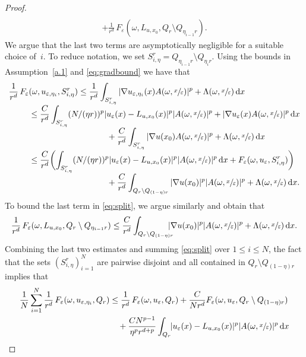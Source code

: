 \documentclass[10pt]{amsart}
\theoremstyle{definition}
\let\e\varepsilon
\let\w\omega
\newcommand{\dx}{\,\mathrm{d}x}
\begin{document}
\begin{proof}
\begin{multline}
\\
+\frac{1}{r^d}\,F_{\e}(\w,L_{u,x_0},Q_{r}\setminus Q_{\eta_{i-1}r}).
\end{multline}
We argue that the last two terms are asymptotically negligible for a suitable choice of~$i$. To reduce notation, we set $S_{i,\eta}^r=Q_{\eta_{i-1}r}\setminus Q_{\eta_i r}$. Using the bounds in Assumption~\ref{a.1} and \eqref{eq:gradbound} we have that
\begin{align*}
\frac{1}{r^d}\,F_{\e}&(\w,u_{\e,\eta_i},S^r_{i,\eta})\leq \frac{1}{r^d}\int_{S^r_{i,\eta}}|\nabla u_{\e,\eta_i}(x)A(\w,\sfrac{x}{\e})|^p+\Lambda(\w,\sfrac{x}{\e})\dx
\\[-3pt]
&\leq \frac{C}{r^d}\int_{S^r_{i,\eta}}(N/(\eta r))^{p} |u_{\e}(x)-L_{u,x_0}(x)|^p|A(\w,\sfrac{x}{\e})|^p+|\nabla u_{\e}(x)A(\w,\sfrac{x}{\e})|^p\dx
\\[-3pt]
&\hspace*{3.3cm}+\frac{C}{r^d}\int_{S^r_{i,\eta}}|\nabla u(x_0)A(\w,\sfrac{x}{\e})|^p+\Lambda(\w,\sfrac{x}{\e})\dx
\\[-3pt]
&\leq \frac{C}{r^d} \biggl(\int_{S_{i,\eta}^r}(N/(\eta r))^{p} |u_{\e}(x)-L_{u,x_0}(x)|^p|A(\w,\sfrac{x}{\e})|^p\dx+F_{\e}(\w,u_{\e},S_{i,\eta}^r)\biggr)
\\[-3pt]
&\hspace*{3.3cm}+\frac{C}{r^d}\int_{Q_r\setminus Q_{(1-\eta)r}}|\nabla u(x_0)|^p|A(\w,\sfrac{x}{\e})|^p+\Lambda(\w,\sfrac{x}{\e})\dx.
\end{align*}
To bound the last term in \eqref{eq:split}, we argue similarly and obtain that
\begin{equation*}
\frac{1}{r^d}\,F_{\e}(\w,L_{u,x_0},Q_{r}\setminus Q_{\eta_{i-1}r})\leq \frac{C}{r^d}\int_{Q_r\setminus Q_{(1-\eta) r}}\hspace*{-3mm}|\nabla u(x_0)|^p|A(\w,\sfrac{x}{\e})|^p+\Lambda(\w,\sfrac{x}{\e})\dx.
\end{equation*}
Combining the last two estimates and summing \eqref{eq:split} over $1\leq i\leq N$, the fact that the sets $(S^r_{i,\eta})_{i=1}^N$ are pairwise disjoint and all contained in $Q_r\setminus Q_{(1-\eta)r}$ implies that
\begin{align*}
\frac{1}{N}\sum_{i=1}^N\frac{1}{r^d}\,F_{\e}(\w,u_{\e,\eta_i},Q_r)&\leq \frac{1}{r^d}\,F_{\e}(\w,u_{\e},Q_r)+\frac{C}{Nr^d} F_{\e}(\w,u_{\e},Q_r\setminus Q_{(1-\eta)r})
\\
&\quad+\frac{CN^{p-1}}{\eta^p r^{d+p}}\int_{Q_r}\hspace*{-1mm}|u_{\e}(x)-L_{u,x_0}(x)|^p|A(\w,\sfrac{x}{\e})|^p\dx
\\

\end{align*}
\end{proof}
\end{document}
